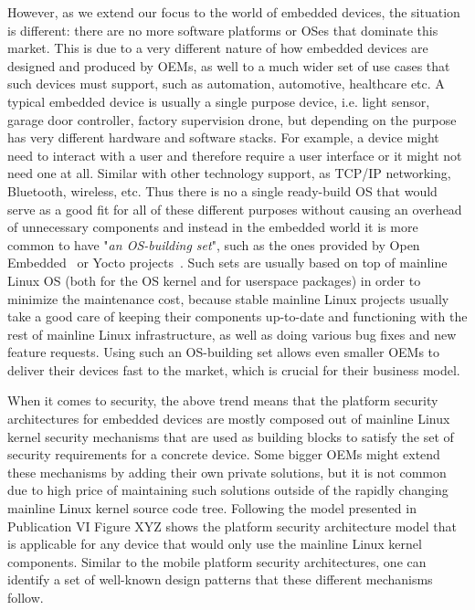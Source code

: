 However, as we extend our focus to the world of embedded devices, the situation is different: there are no more software platforms or OSes that dominate this market. This is due to a very different nature of how embedded devices are designed and produced by OEMs, as well to a much wider set of use cases that such devices must support, such as automation, automotive, healthcare etc. A typical embedded device is usually a single purpose device, i.e. light sensor, garage door controller, factory supervision drone, but depending on the purpose has very different hardware and software stacks. For example, a device might need to interact with a user and therefore require a user interface or it might not need one at all. Similar with other technology support, as TCP/IP networking, Bluetooth, wireless, etc. 
Thus there is no a single ready-build OS that would serve as a good fit for all of these different purposes without causing an overhead of unnecessary components and instead in the embedded world it is more common to have "\textit{an OS-building set}", such as the ones provided by Open Embedded~\cite{OE2017} or Yocto projects~\cite{yocto2017}. Such sets are usually based on top of mainline Linux OS (both for the OS kernel and for userspace packages) in order to minimize the maintenance cost, because stable mainline Linux projects usually take a good care of keeping their components up-to-date and functioning with the rest of mainline Linux infrastructure, as well as doing various bug fixes and new feature requests. Using such an OS-building set allows even smaller OEMs to deliver their devices fast to the market, which is crucial for their business model. 

When it comes to security, the above trend means that the platform security architectures for embedded devices are mostly composed out of mainline Linux kernel security mechanisms that are used as building blocks to satisfy the set of security requirements for a concrete device. Some bigger OEMs might extend these mechanisms by adding their own private solutions, but it is not common due to high price of maintaining such solutions outside of the rapidly changing mainline Linux kernel source code tree. Following the model presented in Publication VI Figure XYZ shows the platform security architecture model that is applicable for any device that would only use the mainline Linux kernel components. Similar to the mobile platform security architectures, one can identify a set of well-known design patterns that these different mechanisms follow.

